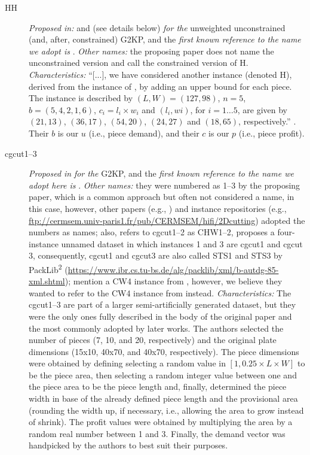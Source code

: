 \documentclass[ppgc,prop-tese,english,formais,babel]{iiufrgs}
\begin{document}
\begin{description}
\item [HH] \emph{Proposed in:} \citet{herz:1972} and \citet{hifi:1997} (see details below) \emph{for the} unweighted unconstrained (and, after, constrained) G2KP, and the \emph{first known reference to the name we adopt is} \citet{cung:2000}. \emph{Other names:} the proposing paper does not name the unconstrained version and \citet{hifi:1997} call the constrained version of H. \emph{Characteristics: } ``[...], we have considered another instance (denoted H), derived from the instance of \citet{herz:1972}, by adding an upper bound for each piece. The instance is described by \((L, W) = (127, 98)\), \(n = 5\), \(b = (5, 4, 2, 1, 6)\), \(c_i = l_i \times w_i\) and \((l_i, wi)\), for \(i = 1 \dots 5\), are given by \((21, 13)\), \((36, 17)\), \((54, 20)\), \((24, 27)\) and \((18, 65)\), respectively.'' \citep{hifi:1997}. Their \(b\) is our \(u\) (i.e., piece demand), and their \(c\) is our \(p\) (i.e., piece profit).
\item [cgcut1--3] \emph{Proposed in} \citet{cw:1977} \emph{for the} G2KP, and the \emph{first known reference to the name we adopt here is} \citet{martello:1998}. \emph{Other names:} they were numbered as 1--3 by the proposing paper, which is a common approach but often not considered a name, in this case, however, other papers (e.g., \citet{hifi:1997}) and instance repositories (e.g., \url{ftp://cermsem.univ-paris1.fr/pub/CERMSEM/hifi/2Dcutting}) adopted the numbers as names; also, \citet{fayard:1998} refers to cgcut1--2 as CHW1--2, \citet{tschoke:1995} proposes a four-instance unnamed dataset in which instances 1 and 3 are cgcut1 and cgcut 3, consequently, cgcut1 and cgcut3 are also called STS1 and STS3 by PackLib\textsuperscript{2} (\url{https://www.ibr.cs.tu-bs.de/alg/packlib/xml/b-autdg-85-xml.shtml}); \citet{velasco:2019} mention a CW4 instance from \citet{cw:1977}, however, we believe they wanted to refer to the CW4 instance from \citet{fayard:1998} instead. \emph{Characteristics:} The cgcut1--3 are part of a larger semi-artificially generated dataset, but they were the only ones fully described in the body of the original paper and the most commonly adopted by later works. The authors selected the number of pieces (7, 10, and 20, respectively) and the original plate dimensions (15x10, 40x70, and 40x70, respectively). The piece dimensions were obtained by defining selecting a random value in \([1, 0.25\times L \times W]\) to be the piece area, then selecting a random integer value between one and the piece area to be the piece length and, finally, determined the piece width in base of the already defined piece length and the provisional area (rounding the width up, if necessary, i.e., allowing the area to grow instead of shrink). The profit values were obtained by multiplying the area by a random real number between 1 and 3. Finally, the demand vector was handpicked by the authors to best suit their purposes.

\end{description}
\end{document}
